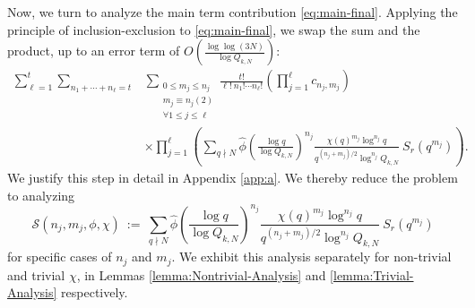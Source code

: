 \documentclass[12pt, reqno,oneside]{amsart}
\theoremstyle{plain}
\theoremstyle{definition}
\theoremstyle{remark}
\theoremstyle{plain}
\numberwithin{equation}{section}
\begin{document}
Now, we turn to analyze the main term contribution \eqref{eq:main-final}. Applying the principle of inclusion-exclusion to \eqref{eq:main-final}, we swap the sum and the product, up to an error term of $O\left(\frac{\log\log(3N)}{\log Q_{k,N}}\right)$:
\begin{align}\label{bigsum}\nonumber
\sum_{\ell=1}^t\sum_{n_1+\cdots+n_\ell=t}&\sum_{\substack{0\leq m_j\leq n_j\\ m_j\equiv n_j(2) \\ \forall1\leq j\leq\ell}}\frac{t!}{\ell! \ n_1!\cdots n_\ell!}\left(\prod_{j=1}^\ell c_{n_j,m_j}\right)\\
&\times\prod_{j=1}^\ell\left(\sum_{q\nmid N}\widehat{\phi}\left(\frac{\log q}{\log Q_{k,N}}\right)^{n_j}\frac{\chi(q)^{m_j}\log^{n_j} q}{q^{(n_j+m_j)/2}\log^{n_j} Q_{k,N}} \ S_r\left(q^{m_j}\right)\right).
\end{align}
We justify this step in detail in Appendix \ref{app:a}. 
We thereby reduce the problem to analyzing 
\begin{equation}\label{littlesum}
\mathcal{S}(n_j,m_j,\phi,\chi) \ := \ \sum_{q\nmid N}\widehat{\phi}\left(\frac{\log q}{\log Q_{k,N}}\right)^{n_j}\frac{\chi(q)^{m_j}\log^{n_j} q}{q^{(n_j+m_j)/2}\log^{n_j} Q_{k,N}} \ S_r\left(q^{m_j}\right)
\end{equation} 
for specific cases of $n_j$ and $m_j$. We exhibit this analysis separately for non-trivial and trivial $\chi$, in Lemmas \ref{lemma:Nontrivial-Analysis} and \ref{lemma:Trivial-Analysis} respectively.
\end{document}
